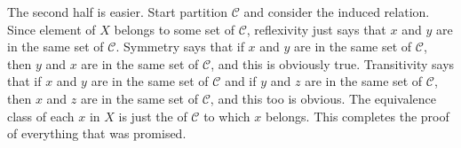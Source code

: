 The second half is easier. Start partition $\mathcal{C}$ and consider the induced relation. Since element of $X$ belongs to some set of $\mathcal{C}$, reflexivity just says that $x$ and $y$ are in the same set of $\mathcal{C}$. Symmetry says that if $x$ and $y$ are in the same set of $\mathcal{C}$, then $y$ and $x$ are in the same set of $\mathcal{C}$, and this is obviously true.  Transitivity says that if $x$ and $y$ are in the same set of $\mathcal{C}$ and if $y$ and $z$ are in the same set of $\mathcal{C}$, then $x$ and $z$ are in the same set of $\mathcal{C}$, and this too is obvious. The equivalence class of each $x$ in $X$ is just the of $\mathcal{C}$ to which $x$ belongs. This completes the proof of everything that was promised.